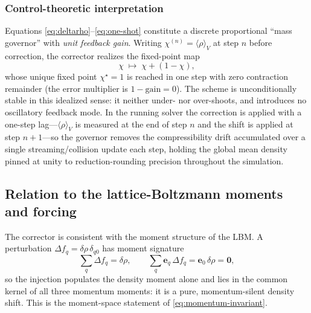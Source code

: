 \documentclass[11pt]{article}
\theoremstyle{definition}
\theoremstyle{remark}
\begin{document}
\subsubsection{Control-theoretic interpretation}
Equations \eqref{eq:deltarho}--\eqref{eq:one-shot} constitute a discrete
proportional ``mass governor'' with \emph{unit feedback gain}. Writing
$\chi^{(n)}=\langle\rho\rangle_V$ at step $n$ before correction, the corrector
realizes the fixed-point map
\begin{equation}
\chi \;\longmapsto\; \chi + (1-\chi),
\label{eq:fixed-point}
\end{equation}
whose unique fixed point $\chi^{\star}=1$ is reached in one step with zero
contraction remainder (the error multiplier is $1-\mathrm{gain}=0$). The scheme
is unconditionally stable in this idealized sense: it neither under- nor
over-shoots, and introduces no oscillatory feedback mode. In the running solver
the correction is applied with a one-step lag---$\langle\rho\rangle_V$ is measured
at the end of step $n$ and the shift is applied at step $n{+}1$---so the governor
removes the compressibility drift accumulated over a single streaming/collision
update each step, holding the global mean density pinned at unity to
reduction-rounding precision throughout the simulation.

\subsection{Relation to the lattice-Boltzmann moments and forcing}
\label{sec:T5}

The corrector is consistent with the moment structure of the LBM. A perturbation
$\Delta f_q=\delta\rho\,\delta_{q0}$ has moment signature
\begin{equation}
\sum_q \Delta f_q=\delta\rho,
\qquad
\sum_q \mathbf{e}_q\,\Delta f_q=\mathbf{e}_0\,\delta\rho=\mathbf{0},
\label{eq:injection-moments}
\end{equation}
so the injection populates the density moment alone and lies in the common kernel
of all three momentum moments: it is a pure, momentum-silent density shift. This
is the moment-space statement of \eqref{eq:momentum-invariant}.
\end{document}

